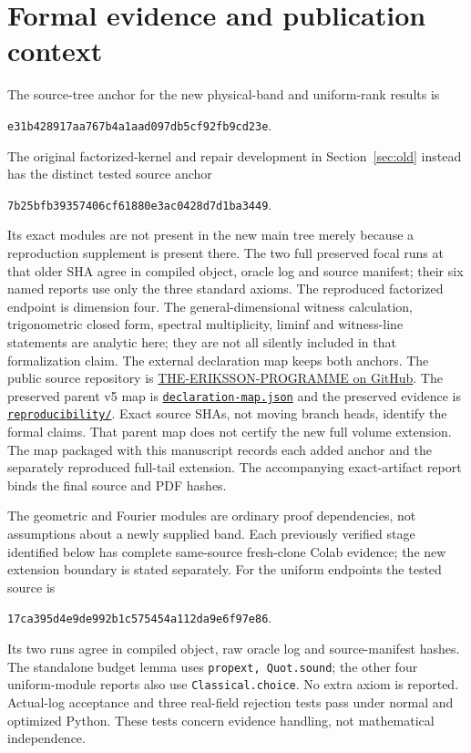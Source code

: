 \documentclass[11pt]{article}
\begin{document}
\section{Formal evidence and publication context}
The source-tree anchor for the new physical-band and uniform-rank results is
\begin{center}\small\texttt{e31b428917aa767b4a1aad097db5cf92fb9cd23e}.\end{center}
The original factorized-kernel and repair development in
Section~\ref{sec:old} instead has the distinct tested source anchor
\begin{center}\small\texttt{7b25bfb39357406cf61880e3ac0428d7d1ba3449}.\end{center}
Its exact modules are not present in the new main tree merely because a
reproduction supplement is present there. The two full preserved focal runs
at that older SHA agree in compiled object, oracle log and source manifest;
their six named reports use only the three standard axioms. The reproduced
factorized endpoint is dimension four. The general-dimensional witness
calculation, trigonometric closed form, spectral multiplicity, liminf and
witness-line statements are analytic here; they are not all silently included
in that formalization claim. The external declaration map keeps both anchors. The public source repository is
\href{https://github.com/lluiseriksson/THE-ERIKSSON-PROGRAMME}{THE-ERIKSSON-PROGRAMME on GitHub}.
The preserved parent v5 map is
\href{https://github.com/lluiseriksson/THE-ERIKSSON-PROGRAMME/blob/d9e2a805796e6901dc9b5565f67f975cd5e41760/papers/flat-coarse-rank/v5-candidate/declaration-map.json}{\texttt{declaration-map.json}}
and the preserved evidence is
\href{https://github.com/lluiseriksson/THE-ERIKSSON-PROGRAMME/tree/e31b428917aa767b4a1aad097db5cf92fb9cd23e/reproducibility}{\texttt{reproducibility/}}. Exact source SHAs, not moving branch heads,
identify the formal claims. That parent map does not certify the new full volume extension. The map packaged with this manuscript records each added anchor and the separately reproduced full-tail extension. The accompanying exact-artifact report binds the final source and PDF hashes.

The geometric and Fourier modules are ordinary proof dependencies, not
assumptions about a newly supplied band. Each previously verified stage identified below has complete
same-source fresh-clone Colab evidence; the new extension boundary is stated separately. For the uniform endpoints the tested
source is
\begin{center}\small\texttt{17ca395d4e9de992b1c575454a112da9e6f97e86}.\end{center}
Its two runs
agree in compiled object, raw oracle log and source-manifest hashes. The
standalone budget lemma uses \texttt{propext, Quot.sound}; the other four
uniform-module reports also use \texttt{Classical.choice}. No extra axiom is
reported. Actual-log acceptance and three real-field rejection tests pass
under normal and optimized Python. These tests concern evidence handling,
not mathematical independence.
\end{document}
